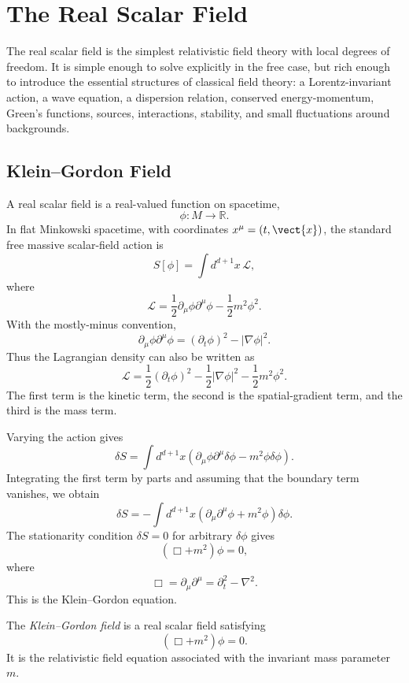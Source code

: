 \chapter{The Real Scalar Field}

\begin{remarkbox}
The real scalar field is the simplest relativistic field theory with local
degrees of freedom. It is simple enough to solve explicitly in the free case,
but rich enough to introduce the essential structures of classical field theory:
a Lorentz-invariant action, a wave equation, a dispersion relation, conserved
energy-momentum, Green's functions, sources, interactions, stability, and small
fluctuations around backgrounds.
\end{remarkbox}

\section{Klein--Gordon Field}

A real scalar field is a real-valued function on spacetime,
\[
    \phi : M \to \mathbb{R}.
\]
In flat Minkowski spacetime, with coordinates \(x^\mu=(t,\vect{x})\), the
standard free massive scalar-field action is
\[
    S[\phi]=\int d^{d+1}x\,\mathcal{L},
\]
where
\[
    \mathcal{L}
    =\frac{1}{2}\partial_\mu\phi\partial^\mu\phi
     -\frac{1}{2}m^2\phi^2.
\]
With the mostly-minus convention,
\[
    \partial_\mu\phi\partial^\mu\phi
    =(\partial_t\phi)^2-|\nabla\phi|^2.
\]
Thus the Lagrangian density can also be written as
\[
    \mathcal{L}
    =\frac{1}{2}(\partial_t\phi)^2
     -\frac{1}{2}|\nabla\phi|^2
     -\frac{1}{2}m^2\phi^2.
\]
The first term is the kinetic term, the second is the spatial-gradient term,
and the third is the mass term.

Varying the action gives
\[
    \delta S
    =\int d^{d+1}x\left(
        \partial_\mu\phi\partial^\mu\delta\phi
        -m^2\phi\delta\phi
    \right).
\]
Integrating the first term by parts and assuming that the boundary term
vanishes, we obtain
\[
    \delta S
    =-\int d^{d+1}x\left(\partial_\mu\partial^\mu\phi+m^2\phi\right)\delta\phi.
\]
The stationarity condition \(\delta S=0\) for arbitrary \(\delta\phi\) gives
\[
    (\Box+m^2)\phi=0,
\]
where
\[
    \Box=\partial_\mu\partial^\mu=\partial_t^2-\nabla^2.
\]
This is the Klein--Gordon equation.

\begin{definitionbox}
The \emph{Klein--Gordon field} is a real scalar field satisfying
\[
    (\Box+m^2)\phi=0.
\]
It is the relativistic field equation associated with the invariant mass
parameter \(m\).
\end{definitionbox}

